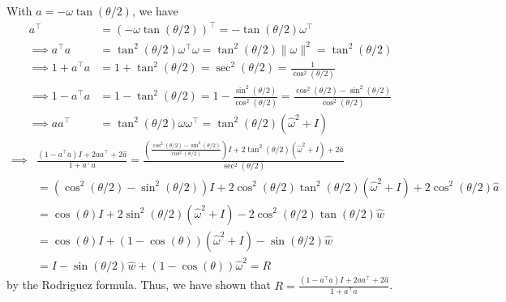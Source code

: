 With \( a = -\omega \tan(\theta / 2) \), we have
\begin{align*}
    a^\top
     & =
    {(-\omega \tan(\theta / 2))}^\top
    =
    -\tan(\theta / 2) \omega^\top
    \\
    \implies
    a^{\top} a
     & =
    \tan^{2}(\theta / 2) \omega^\top \omega
    =
    \tan^{2}(\theta / 2) \| \omega \|^{2}
    =
    \tan^{2}(\theta / 2)
    \\
    \implies
    1 + a^{\top} a
     & =
    1 + \tan^{2}(\theta / 2)
    =
    \sec^{2}(\theta / 2)
    =
    \frac{1}{\cos^{2}(\theta / 2)}
    \\
    \implies
    1 - a^{\top} a
     & =
    1 - \tan^{2}(\theta / 2)
    =
    1 - \frac{\sin^{2}(\theta / 2)}{\cos^{2}(\theta / 2)}
    =
    \frac{\cos^{2}(\theta / 2) - \sin^{2}(\theta / 2)}{\cos^{2}(\theta / 2)}
    \\
    \implies
    a a^{\top}
     & =
    \tan^{2}(\theta / 2) \omega \omega^{\top}
    =
    \tan^{2}(\theta / 2) (\widehat{\omega}^2 + I)
\end{align*}
\begin{align*}
    \implies
     &
    \frac{(1 - a^{\top} a) I + 2 a a^{\top} + 2 \widehat{a}}{1 + a^{\top} a}
    =
    \frac{\left( \frac{\cos^{2}(\theta / 2) - \sin^{2}(\theta / 2)}{\cos^{2}(\theta / 2)} \right) I + 2 \tan^{2}(\theta / 2) (\widehat{\omega}^2 + I) + 2 \widehat{a}}{\sec^{2}(\theta / 2)}
    \\ & =
    \left( \cos^{2}(\theta / 2) - \sin^{2}(\theta / 2) \right) I + 2 \cos^{2}(\theta / 2) \tan^{2}(\theta / 2) (\widehat{\omega}^2 + I) + 2 \cos^{2}(\theta / 2) \widehat{a}
    \\ & =
    \cos(\theta) I + 2 \sin^{2}(\theta / 2) (\widehat{\omega}^2 + I) - 2 \cos^{2}(\theta / 2) \tan(\theta / 2) \widehat{w}
    \\ & =
    \cos(\theta) I + (1 - \cos(\theta)) (\widehat{\omega}^2 + I) - \sin(\theta / 2) \widehat{w}
    \\ & =
    I - \sin(\theta / 2) \widehat{w} + (1 - \cos(\theta)) \widehat{\omega}^2
    =
    R
\end{align*}
by the Rodriguez formula.
Thus, we have shown that \( \boxed{R = \frac{(1 - a^{\top} a) I + 2 a a^{\top} + 2 \widehat{a}}{1 + a^{\top} a}} \).


